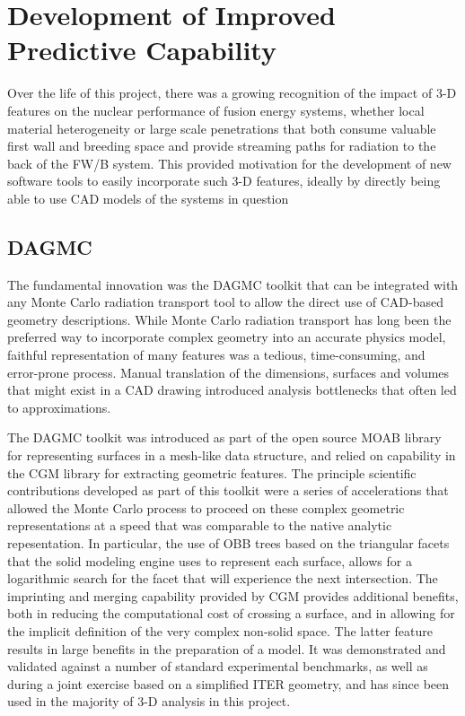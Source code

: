 \chapter{Development of Improved Predictive Capability}

Over the life of this project, there was a growing recognition of the impact
of 3-D features on the nuclear performance of fusion energy systems, whether
local material heterogeneity or large scale penetrations that both consume
valuable first wall and breeding space and provide streaming paths for
radiation to the back of the \gls{FW/B} system.  This provided motivation for
the development of new software tools to easily incorporate such 3-D features,
ideally by directly being able to use \gls{CAD} models of the systems in
question

\section{\acrfull{DAGMC}}

The fundamental innovation was the \gls{DAGMC} toolkit that can be integrated
with any Monte Carlo radiation transport tool to allow the direct use of
\gls{CAD}-based geometry descriptions.  While Monte Carlo radiation transport
has long been the preferred way to incorporate complex geometry into an
accurate physics model, faithful representation of many features was a
tedious, time-consuming, and error-prone process.  Manual translation of the
dimensions, surfaces and volumes that might exist in a \gls{CAD} drawing
introduced analysis bottlenecks that often led to approximations.

The \gls{DAGMC} toolkit was introduced as part of the
open source \gls{MOAB} library for representing surfaces in a
mesh-like data structure, and relied on capability in the
\gls{CGM} library for extracting geometric features.  The
principle scientific contributions developed as part of this toolkit were a
series of accelerations that allowed the Monte Carlo process to proceed on
these complex geometric representations at a speed that was comparable to the
native analytic repesentation.  In particular, the use of \gls{OBB} trees
based on the triangular facets that the solid modeling engine uses to
represent each surface, allows for a logarithmic search for the facet that
will experience the next intersection.  The imprinting and merging capability
provided by \gls{CGM} provides additional benefits, both in reducing the
computational cost of crossing a surface, and in allowing for the implicit
definition of the very complex non-solid space.  The latter feature results in
large benefits in the preparation of a model. It was
demonstrated and validated against a number of standard experimental
benchmarks, as well as during a joint exercise
based on a simplified ITER geometry, and has since
been used in the majority of 3-D analysis in this project.

